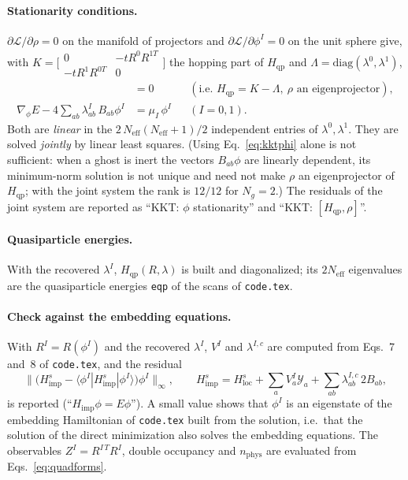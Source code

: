 \documentclass[11pt]{article}
\newcommand{\Neff}{N_{\mathrm{eff}}}
\newcommand{\Ng}{N_{g}}
\newcommand{\Hqp}{H_{\mathrm{qp}}}
\newcommand{\Himp}{H_{\mathrm{imp}}}
\begin{document}
\paragraph{Stationarity conditions.} $\partial\mathcal L/\partial\rho=0$ on the manifold of
projectors and $\partial\mathcal L/\partial\phi^I=0$ on the unit sphere give, with
$K=\bigl[\begin{smallmatrix}0&-tR^0R^{1T}\\-tR^1R^{0T}&0\end{smallmatrix}\bigr]$ the hopping
part of $\Hqp$ and $\Lambda=\mathrm{diag}(\lambda^0,\lambda^1)$,
\begin{align}
  [\,K-\Lambda,\ \rho\,]&=0 &&(\text{i.e. }\Hqp=K-\Lambda,\ \rho\text{ an eigenprojector}),
  \label{eq:kktpsi}\\
  \nabla_{\phi}E-4\sum_{ab}\lambda^{I}_{ab}\,B_{ab}\phi^{I}&=\mu_I\,\phi^{I}
  &&(I=0,1).
  \label{eq:kktphi}
\end{align}
Both are \emph{linear} in the $2\,\Neff(\Neff+1)/2$ independent entries of $\lambda^0,\lambda^1$.
They are solved \emph{jointly} by linear least squares. (Using Eq.~\eqref{eq:kktphi} alone is
not sufficient: when a ghost is inert the vectors $B_{ab}\phi$ are linearly dependent, its
minimum-norm solution is not unique and need not make $\rho$ an eigenprojector of
$\Hqp$; with the joint system the rank is $12/12$ for $\Ng=2$.) The residuals of the
joint system are reported as ``KKT: $\phi$ stationarity'' and ``KKT: $[\Hqp,\rho]$''.

\paragraph{Quasiparticle energies.} With the recovered $\lambda^I$, $\Hqp(R,\lambda)$ is
built and diagonalized; its $2\Neff$ eigenvalues are the quasiparticle energies
\texttt{eqp} of the scans of \texttt{code.tex}.

\paragraph{Check against the embedding equations.} With $R^I=R(\phi^I)$ and the recovered
$\lambda^I$, $V^I$ and $\lambda^{I,c}$ are computed from Eqs.~7 and~8 of \texttt{code.tex}, and
the residual
\begin{equation}
  \bigl\lVert\bigl(\Himp^{s}-\langle\phi^I|\Himp^{s}|\phi^I\rangle\bigr)\phi^{I}\bigr\rVert_\infty,
  \qquad
  \Himp^{s}=H^{s}_{\mathrm{loc}}+\sum_aV^I_a\mathcal Y_a+\sum_{ab}\lambda^{I,c}_{ab}\,2B_{ab},
\end{equation}
is reported (``$\Himp\phi=E\phi$''). A small value shows that $\phi^I$ is an eigenstate of
the embedding Hamiltonian of \texttt{code.tex} built from the solution, i.e.\ that the
solution of the direct minimization also solves the embedding equations. The observables
$Z^I=R^{I\,T}R^I$, double occupancy and $n_{\mathrm{phys}}$ are evaluated from
Eqs.~\eqref{eq:quadforms}.
\end{document}

